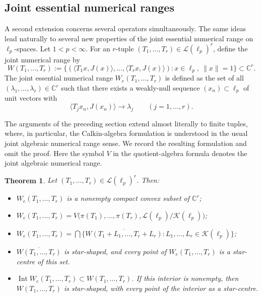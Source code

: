 \documentclass[11pt]{amsart}
\numberwithin{equation}{section}
\newtheorem{theorem}{Theorem}[section]
\theoremstyle{definition}
\theoremstyle{remark}
\newcommand{\C}{\mathbb{C}}
\begin{document}
\subsection{Joint essential numerical ranges}

A second extension concerns several operators simultaneously. The same ideas lead naturally to several new properties of the joint essential numerical range on $\ell_p$-spaces. Let $1<p<\infty$. For an $r$-tuple $(T_1,\dots,T_r)\in \mathcal L(\ell_p)^r$, define the joint numerical range by
\[
W(T_1,\dots,T_r):=
\bigl\{(\langle T_1x,J(x)\rangle,\dots,\langle T_rx,J(x)\rangle):
x\in\ell_p,\ \|x\|=1\bigr\}\subset\mathbb C^r.
\]
The joint essential numerical range \(W_e(T_1,\dots,T_r)\) is defined as the set of all $(\lambda_1,\dots,\lambda_r)\in\C^r$ such that there exists a weakly-null sequence 
$(x_n)\subset\ell_p$ of unit vectors with
\[
\langle T_j x_n,J(x_n)\rangle\to \lambda_j
\qquad (j=1,\dots,r).
\]

The arguments of the preceding section extend almost literally to finite tuples, where, in particular, the Calkin-algebra formulation is understood in the usual joint algebraic numerical range sense.
We record the resulting formulation and omit the proof. 
Here the symbol $V$ in the quotient-algebra formula denotes the joint algebraic numerical range.

\begin{theorem} 
Let $(T_1,\dots,T_r)\in \mathcal L(\ell_p)^r$. Then:
\begin{itemize}
\item[(i)] $W_e(T_1,\dots,T_r)$ is a nonempty compact convex subset of $\C^r$;
\item[(ii)] $W_e(T_1,\dots,T_r)=V\bigl(\pi(T_1),\dots,\pi(T_r),\mathcal L(\ell_p)/\mathcal K(\ell_p)\bigr)$;
\item[(iii)] $W_e(T_1,\dots,T_r)=\bigcap\{\overline{W(T_1+L_1,\dots,T_r+L_r)}: L_1,\dots,L_r\in \mathcal K(\ell_p)\}$;
\item[(iv)] $\overline{W(T_1,\dots,T_r)}$ is star-shaped, and every point of $W_e(T_1,\dots,T_r)$ is a star-centre of this set.
\item[(v)] $\operatorname{Int} W_e(T_1,\dots,T_r)\subset W(T_1,\dots,T_r)$. If this interior is nonempty, then $W(T_1,\dots,T_r)$ is star-shaped, with every point of the interior as a star-centre.
\end{itemize}
\end{theorem}
\end{document}
